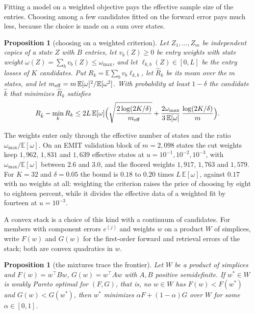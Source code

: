 \documentclass[11pt]{article}
\newtheorem{proposition}[lemma]{Proposition}
\theoremstyle{remark}
\newcommand{\E}{\mathbb{E}}
\newcommand{\1}{\mathbf{1}}
\begin{document}
Fitting a model on a weighted objective pays the effective sample size of the entries. Choosing among a few candidates
fitted on the forward error pays much less, because the choice is made on a sum over states.

\begin{proposition}[choosing on a weighted criterion]\label{prop:select}
Let $Z_1,\dots,Z_m$ be independent copies of a state $Z$ with $B$ entries, let $v_b(Z)\ge0$ be entry weights with state
weight $\omega(Z)=\sum_bv_b(Z)\le\omega_{\max}$, and let $\ell_{k,b}(Z)\in[0,L]$ be the entry losses of $K$ candidates.
Put $R_k=\E\sum_bv_b\ell_{k,b}$, let $\hat R_k$ be its mean over the $m$ states, and let
$m_{\rm eff}=m\,\E[\omega]^2/\E[\omega^2]$. With probability at least $1-\delta$ the candidate $\hat k$ that minimizes
$\hat R_k$ satisfies
\[
R_{\hat k}-\min_kR_k\le2L\,\E[\omega]\Bigl(\sqrt{\frac{2\log(2K/\delta)}{m_{\rm eff}}}
+\frac{2\omega_{\max}}{3\,\E[\omega]}\,\frac{\log(2K/\delta)}{m}\Bigr).
\]
\end{proposition}

The weights enter only through the effective number of states and the ratio $\omega_{\max}/\E[\omega]$. On an EMIT
validation block of $m=2{,}098$ states the cut weights keep $1{,}962$, $1{,}831$ and $1{,}639$ effective states at
$u=10^{-1},10^{-2},10^{-3}$, with $\omega_{\max}/\E[\omega]$ between $2.6$ and $3.0$, and the floored weights $1{,}917$,
$1{,}763$ and $1{,}579$. For $K=32$ and $\delta=0.05$ the bound is $0.18$ to $0.20$ times $L\,\E[\omega]$, against
$0.17$ with no weights at all: weighting the criterion raises the price of choosing by eight to eighteen percent, while
it divides the effective data of a weighted fit by fourteen at $u=10^{-3}$.

A convex stack is a choice of this kind with a continuum of candidates. For members with component errors $e^{(j)}$ and
weights $w$ on a product $W$ of simplices, write $F(w)$ and $G(w)$ for the first-order forward and retrieval errors of
the stack; both are convex quadratics in $w$.

\begin{proposition}[the mixtures trace the frontier]\label{prop:pareto}
Let $W$ be a product of simplices and $F(w)=w^\top Bw$, $G(w)=w^\top Aw$ with $A,B$ positive semidefinite. If $w^\ast\in
W$ is weakly Pareto optimal for $(F,G)$, that is, no $w\in W$ has $F(w)<F(w^\ast)$ and $G(w)<G(w^\ast)$, then $w^\ast$
minimizes $\alpha F+(1-\alpha)G$ over $W$ for some $\alpha\in[0,1]$.
\end{proposition}
\end{document}
